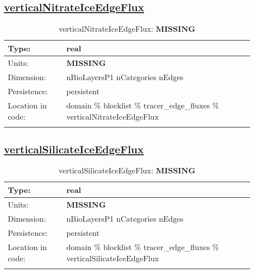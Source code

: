 \subsection[verticalNitrateIceEdgeFlux]{\hyperref[sec:var_tab_tracer_edge_fluxes]{verticalNitrateIceEdgeFlux}}
\label{subsec:var_sec_tracer_edge_fluxes_verticalNitrateIceEdgeFlux}
\begin{center}
\begin{longtable}{| p{2.0in} | p{4.0in} |}
        \hline 
        Type: & real \\
        \hline 
        Units: & {\bf \color{red} MISSING} \\
        \hline 
        Dimension: & nBioLayersP1 nCategories nEdges \\
        \hline 
        Persistence: & persistent \\
        \hline 
         Location in code: & domain \% blocklist \% tracer\_edge\_fluxes \% verticalNitrateIceEdgeFlux \\
         \hline 
    \caption{verticalNitrateIceEdgeFlux: {\bf \color{red} MISSING}}
\end{longtable}
\end{center}
\subsection[verticalSilicateIceEdgeFlux]{\hyperref[sec:var_tab_tracer_edge_fluxes]{verticalSilicateIceEdgeFlux}}
\label{subsec:var_sec_tracer_edge_fluxes_verticalSilicateIceEdgeFlux}
\begin{center}
\begin{longtable}{| p{2.0in} | p{4.0in} |}
        \hline 
        Type: & real \\
        \hline 
        Units: & {\bf \color{red} MISSING} \\
        \hline 
        Dimension: & nBioLayersP1 nCategories nEdges \\
        \hline 
        Persistence: & persistent \\
        \hline 
         Location in code: & domain \% blocklist \% tracer\_edge\_fluxes \% verticalSilicateIceEdgeFlux \\
         \hline 
    \caption{verticalSilicateIceEdgeFlux: {\bf \color{red} MISSING}}
\end{longtable}
\end{center}
